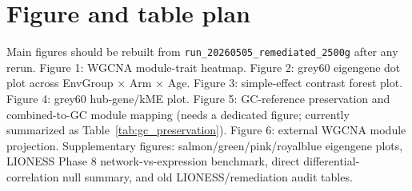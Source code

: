 \documentclass[11pt]{article}
\newcommand{\code}[1]{\texttt{#1}}
\newcommand{\runid}{\code{run\_20260505\_remediated\_2500g}}
\begin{document}
\section*{Figure and table plan}

Main figures should be rebuilt from \runid{} after any rerun. Figure 1: WGCNA module-trait heatmap. Figure 2: grey60 eigengene dot plot across EnvGroup $\times$ Arm $\times$ Age. Figure 3: simple-effect contrast forest plot. Figure 4: grey60 hub-gene/kME plot. Figure 5: GC-reference preservation and combined-to-GC module mapping (needs a dedicated figure; currently summarized as Table~\ref{tab:gc_preservation}). Figure 6: external WGCNA module projection. Supplementary figures: salmon/green/pink/royalblue eigengene plots, LIONESS Phase 8 network-vs-expression benchmark, direct differential-correlation null summary, and old LIONESS/remediation audit tables.
\end{document}
